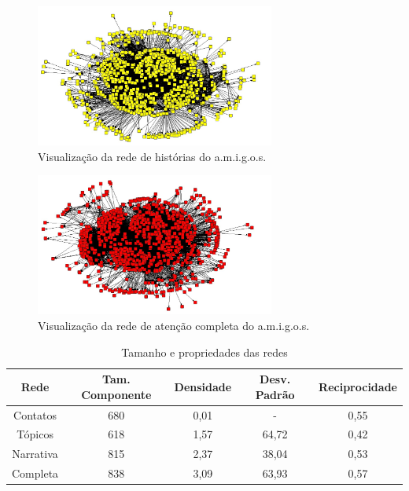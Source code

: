 \begin{figure}[h!]
  \centering
    \includegraphics[width=0.7\textwidth]{imgs/narrativas.jpg}
  \caption{Visualização da rede de histórias do a.m.i.g.o.s.}
    \label{ap:fig:narrativas}
\end{figure}

\begin{figure}[h!]
  \centering
    \includegraphics[width=0.7\textwidth]{imgs/completa.jpg}
  \caption{Visualização da rede de atenção completa do a.m.i.g.o.s.}
    \label{ap:fig:completa}
\end{figure}

\begin{table} [htbp]
	\large       %
	\setlength{\arrayrulewidth}{2\arrayrulewidth}  %
	\setlength{\belowcaptionskip}{10pt}  %
	\caption{Tamanho e propriedades das redes} \centering   %
	\begin{tabular}{| c | c | c | c | c |}
	\hline
	Rede & Tam. Componente & Densidade & Desv. Padrão & Reciprocidade \\ \hline
	Contatos & 680 & 0,01 & - & 0,55 \\
	Tópicos & 618 & 1,57 & 64,72 & 0,42\\
	Narrativa & 815 & 2,37 & 38,04 & 0,53\\
	Completa & 838 & 3,09 & 63,93 & 0,57\\ \hline
	\end{tabular}
	\label{ap:tab:estatisticas}
\end{table}

